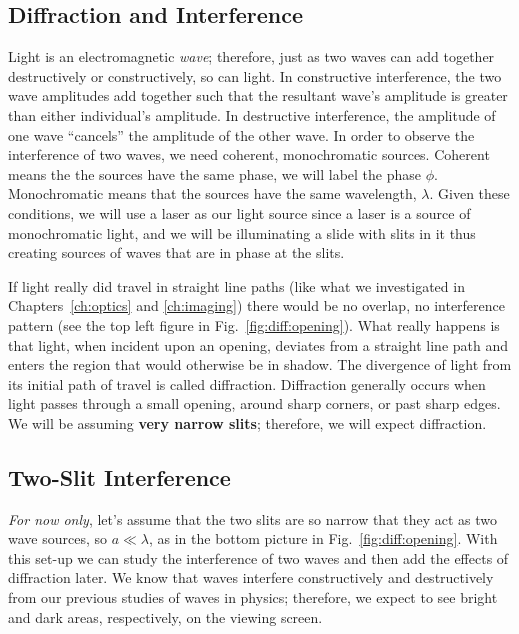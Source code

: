 \subsection{Diffraction and Interference}

Light is an electromagnetic {\it wave}; therefore, just 
as two waves can add together destructively or constructively, so can
light.  In constructive interference,
the two wave amplitudes add together such that the resultant wave's amplitude
is greater than either individual's amplitude.  In destructive interference,
the amplitude of one wave ``cancels'' the amplitude of the other wave.  
In order to observe the interference of two waves, we need coherent,
monochromatic sources.  Coherent means the the sources have the same phase,
we will label the phase $\phi$.  Monochromatic means that the sources have
the same wavelength, $\lambda$.   Given these conditions, we will
use a laser as our light source since a laser is a source of 
monochromatic light,
and we will be illuminating a slide with slits in it thus creating 
sources of waves that are in phase at the slits.  

If light really did travel in straight line paths (like what we investigated 
in Chapters~\ref{ch:optics} and \ref{ch:imaging}) 
there would be no overlap, no interference pattern (see
the top left figure in Fig.~\ref{fig:diff:opening}).  
What really happens is that light, when incident upon an opening, 
deviates from 
a straight line path and enters the region that would otherwise be in 
shadow.  The divergence of light from
its initial path of travel is called diffraction. 
Diffraction generally occurs when light
passes through a small opening, around sharp corners, or past sharp edges.
We will be assuming {\bf very narrow slits}; therefore,
we will expect diffraction.

\subsection{Two-Slit Interference}

{\it For now only}, 
let's assume that the two slits are so narrow that they act as two wave 
sources, so $a \ll \lambda$, as in the bottom picture in 
Fig.~\ref{fig:diff:opening}.  With this set-up we can study the interference
of two waves and then add the effects of diffraction later.  We know
that waves interfere constructively and destructively from our previous
studies of waves in physics; therefore, we expect to see bright and
dark areas, respectively, on the viewing screen.

